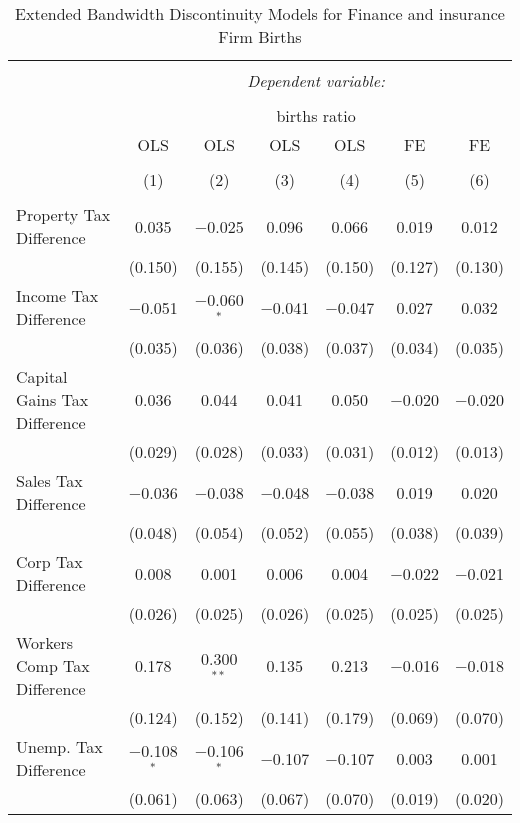 
\begin{table}[!htbp] \centering 
  \caption{Extended Bandwidth Discontinuity Models for  Finance and insurance Firm Births} 
  \label{52eb} 
\begin{tabular}{@{\extracolsep{5pt}}lcccccc} 
\\[-1.8ex]\hline 
\hline \\[-1.8ex] 
 & \multicolumn{6}{c}{\textit{Dependent variable:}} \\ 
\cline{2-7} 
\\[-1.8ex] & \multicolumn{6}{c}{births ratio} \\ 
 & OLS & OLS & OLS & OLS & FE & FE \\ 
\\[-1.8ex] & (1) & (2) & (3) & (4) & (5) & (6)\\ 
\hline \\[-1.8ex] 
 Property Tax Difference & 0.035 & $-$0.025 & 0.096 & 0.066 & 0.019 & 0.012 \\ 
  & (0.150) & (0.155) & (0.145) & (0.150) & (0.127) & (0.130) \\ 
  Income Tax Difference & $-$0.051 & $-$0.060$^{*}$ & $-$0.041 & $-$0.047 & 0.027 & 0.032 \\ 
  & (0.035) & (0.036) & (0.038) & (0.037) & (0.034) & (0.035) \\ 
  Capital Gains Tax Difference & 0.036 & 0.044 & 0.041 & 0.050 & $-$0.020 & $-$0.020 \\ 
  & (0.029) & (0.028) & (0.033) & (0.031) & (0.012) & (0.013) \\ 
  Sales Tax Difference & $-$0.036 & $-$0.038 & $-$0.048 & $-$0.038 & 0.019 & 0.020 \\ 
  & (0.048) & (0.054) & (0.052) & (0.055) & (0.038) & (0.039) \\ 
  Corp Tax Difference & 0.008 & 0.001 & 0.006 & 0.004 & $-$0.022 & $-$0.021 \\ 
  & (0.026) & (0.025) & (0.026) & (0.025) & (0.025) & (0.025) \\ 
  Workers Comp Tax Difference & 0.178 & 0.300$^{**}$ & 0.135 & 0.213 & $-$0.016 & $-$0.018 \\ 
  & (0.124) & (0.152) & (0.141) & (0.179) & (0.069) & (0.070) \\ 
  Unemp. Tax Difference & $-$0.108$^{*}$ & $-$0.106$^{*}$ & $-$0.107 & $-$0.107 & 0.003 & 0.001 \\ 
  & (0.061) & (0.063) & (0.067) & (0.070) & (0.019) & (0.020) \\ 

\end{tabular}
\end{table}
